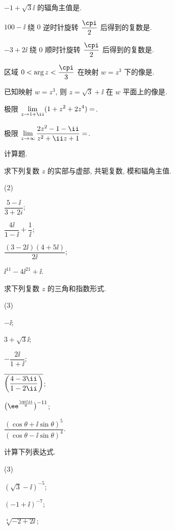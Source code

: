 \begin{homework}
\begin{homework}
    \item $-1+\sqrt 3\ii$ 的辐角主值是\fillblank{}.
    \item $100-\ii$ 绕 $0$ 逆时针旋转 $\dfrac\cpi2$ 后得到的复数是\fillblank{}.
    \item $-3+2\ii$ 绕 $0$ 顺时针旋转 $\dfrac\cpi2$ 后得到的复数是\fillblank{}.
    \item 区域 $0<\arg z<\dfrac\cpi3$ 在映射 $w=z^3$ 下的像是\fillblank[12em]{}.
    \item 已知映射 $w=z^3$, 则 $z=\sqrt3+\ii$ 在 $w$ 平面上的像是\fillblank{}.
    \item 极限 $\displaystyle\lim_{z\ra 1+\ii}(1+z^2+2z^4)=$\fillblank{}.
    \item 极限 $\displaystyle\lim_{z\ra\infty}\dfrac{2z^2-1-\ii}{z^2+\ii z+1}=$\fillblank{}.
  \end{homework}
  \item 计算题.
  \begin{homework}
    \item 求下列复数 $z$ 的实部与虚部, 共轭复数, 模和辐角主值.
    \begin{subhomework}(2)
      \item $\dfrac{5-\ii}{3+2i}$;
      \item $\dfrac{4\ii}{1-\ii}+\dfrac1\ii$;
      \item $\dfrac{(3-2\ii)(4+5\ii)}{2\ii}$;
      \item $\ii^{11}-4\ii^{21}+\ii$.
    \end{subhomework}
    \item 求下列复数 $z$ 的三角和指数形式.
    \begin{subhomework}(3)
      \item $-\ii$;
      \item $3+\sqrt 3\ii$;
      \item $-\dfrac{2\ii}{1+\ii}$;
      \item $\ov{\biggl(\dfrac{4-3\ii}{1-2\ii}\biggr)}$;
      \item $\bigl(\ee^{\frac{\cpi\ii}6}\bigr)^{-11}$;
      \item $\dfrac{(\cos \theta+\ii\sin \theta)^5}{(\cos \theta-\ii\sin \theta)^4}$.
    \end{subhomework}
    \item 计算下列表达式.
    \begin{subhomework}(3)
      \item $(\sqrt3-\ii)^{-5}$;
      \item $(-1+\ii)^{-7}$;
      \item $\sqrt[4]{-2+2\ii}$;

\end{subhomework}
\end{homework}
\end{homework}
